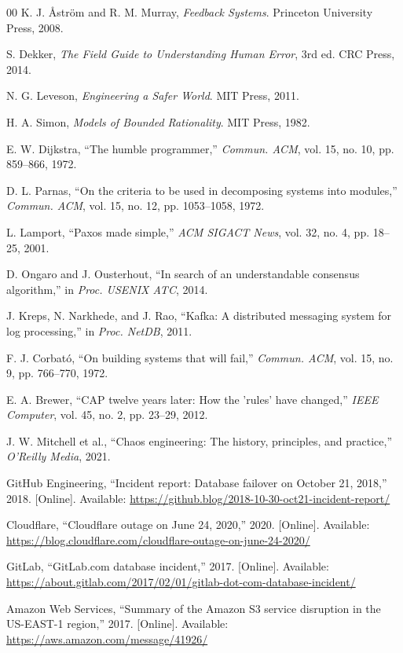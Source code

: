 \documentclass[conference]{IEEEtran}
\begin{document}
\begin{thebibliography}{00}
K. J. \AA{}str\"om and R. M. Murray, \textit{Feedback Systems}. Princeton University Press, 2008.

S. Dekker, \textit{The Field Guide to Understanding Human Error}, 3rd ed. CRC Press, 2014.

N. G. Leveson, \textit{Engineering a Safer World}. MIT Press, 2011.

H. A. Simon, \textit{Models of Bounded Rationality}. MIT Press, 1982.

E. W. Dijkstra, ``The humble programmer,'' \textit{Commun. ACM}, vol. 15, no. 10, pp. 859--866, 1972.

D. L. Parnas, ``On the criteria to be used in decomposing systems into modules,'' \textit{Commun. ACM}, vol. 15, no. 12, pp. 1053--1058, 1972.

L. Lamport, ``Paxos made simple,'' \textit{ACM SIGACT News}, vol. 32, no. 4, pp. 18--25, 2001.

D. Ongaro and J. Ousterhout, ``In search of an understandable consensus algorithm,'' in \textit{Proc. USENIX ATC}, 2014.

J. Kreps, N. Narkhede, and J. Rao, ``Kafka: A distributed messaging system for log processing,'' in \textit{Proc. NetDB}, 2011.

F. J. Corbat\'o, ``On building systems that will fail,'' \textit{Commun. ACM}, vol. 15, no. 9, pp. 766--770, 1972.

E. A. Brewer, ``CAP twelve years later: How the 'rules' have changed,'' \textit{IEEE Computer}, vol. 45, no. 2, pp. 23--29, 2012.

J. W. Mitchell et al., ``Chaos engineering: The history, principles, and practice,'' \textit{O'Reilly Media}, 2021.

GitHub Engineering, ``Incident report: Database failover on October 21, 2018,'' 2018. [Online]. Available: \url{https://github.blog/2018-10-30-oct21-incident-report/}

Cloudflare, ``Cloudflare outage on June 24, 2020,'' 2020. [Online]. Available: \url{https://blog.cloudflare.com/cloudflare-outage-on-june-24-2020/}

GitLab, ``GitLab.com database incident,'' 2017. [Online]. Available: \url{https://about.gitlab.com/2017/02/01/gitlab-dot-com-database-incident/}

Amazon Web Services, ``Summary of the Amazon S3 service disruption in the US-EAST-1 region,'' 2017. [Online]. Available: \url{https://aws.amazon.com/message/41926/}

\end{thebibliography}
\end{document}
